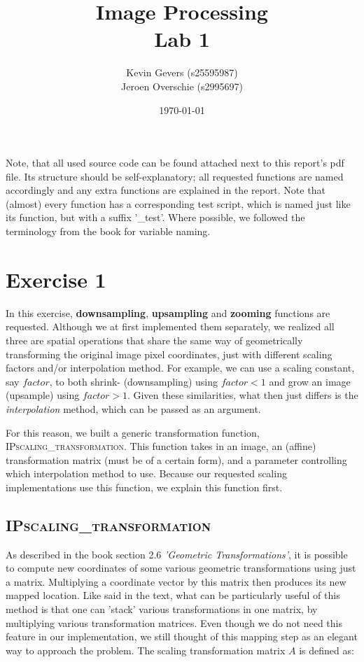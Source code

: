 \documentclass{article}
\title{Image Processing\\
    Lab 1}
\author{Kevin Gevers (s25595987) \\ Jeroen Overschie (s2995697)}
\date{\today}
\begin{document}
\maketitle

Note, that all used source code can be found attached next to this report's pdf file. Its structure should be self-explanatory; all requested functions are named accordingly and any extra functions are explained in the report. Note that (almost) every function has a corresponding test script, which is named just like its function, but with a suffix '\_test'. Where possible, we followed the terminology from the book \citep{gonzalez2008digital} for variable naming.

\section*{Exercise 1}
In this exercise, \textbf{downsampling}, \textbf{upsampling} and \textbf{zooming} functions are requested. Although we at first implemented them separately, we realized all three are spatial operations that share the same way of geometrically transforming the original image pixel coordinates, just with different scaling factors and/or interpolation method. For example, we can use a scaling constant, say $factor$, to both shrink- (downsampling) using $factor < 1$ and grow an image (upsample) using $factor > 1$. Given these similarities, what then just differs is the \textit{interpolation} method, which can be passed as an argument.

For this reason, we built a generic transformation function, \textsc{IPscaling\_transformation}. This function takes in an image, an (affine) transformation matrix (must be of a certain form), and a parameter controlling which interpolation method to use. Because our requested scaling implementations use this function, we explain this function first.

\subsection*{\textsc{IPscaling\_transformation}}
As described in the book \citep{gonzalez2008digital} section 2.6 \textit{'Geometric Transformations'}, it is possible to compute new coordinates of some various geometric transformations using just a matrix. Multiplying a coordinate vector by this matrix then produces its new mapped location. Like said in the text, what can be particularly useful of this method is that one can 'stack' various transformations in one matrix, by multiplying various transformation matrices. Even though we do not need this feature in our implementation, we still thought of this mapping step as an elegant way to approach the problem. The scaling transformation matrix $A$ is defined as:
\end{document}
